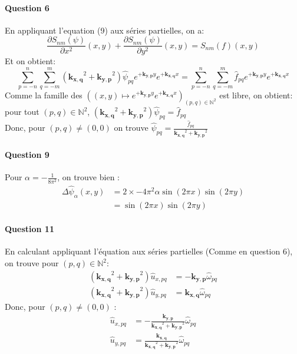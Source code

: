\documentclass{article}
\newcommand{\pd}[2]{\dfrac{\partial#1}{\partial#2}}
\newcommand{\complex}[1]{\bm{#1}}
\newcommand{\kxq}{\complex{k_{x,q}}}
\newcommand{\kyp}{\complex{k_{y,p}}}
\begin{document}
\paragraph{Question 6}
En appliquant l'equation (9) aux séries partielles, on a:
\begin{equation}
	\pd{S_{nm}(\psi)}{x^2}(x,y)
    + 
	\pd{S_{nm}(\psi)}{y^2}(x,y)
	= S_{nm}(f)(x,y)
    \label{eq:poisson}
\end{equation}
Et on obtient:
\begin{equation*}
    \sum_{p=-n}^{n} \sum_{q=-m}^{m} (\kxq^2 + \kyp^2) \hat{\psi}_{pq} e^{+\kyp y} e^{+\kxq x}
	=
		\sum_{p=-n}^{n} \sum_{q=-m}^{m}\hat{f}_{pq} e^{+\kyp y} e^{+\kxq x}
\end{equation*}
Comme la famille des \(((x, y)\mapsto e^{+\kyp y} e^{+\kxq x})_{(p,q)\in\mathbb N^2}\)
est libre, on obtient: pour tout \((p,q)\in\mathbb N^2\), \((\kxq^2 + \kyp^2) \hat{\psi}_{pq} = \hat{f}_{pq}\)
\\
Donc, pour \((p,q)\neq(0,0)\) on trouve \(\hat{\psi}_{pq} = \frac{\hat{f}_{pq}}{\kxq^2 + \kyp^2}\)

\paragraph{Question 9}
Pour \(\alpha = -\frac{1}{8\pi^2}\), on trouve bien :
\begin{align*}
	\Delta \hat{\psi}_{\alpha}(x,y) & = 2\times-4\pi^2\alpha\sin(2\pi x)\sin(2\pi y)\\
	& = \sin(2\pi x)\sin(2\pi y)
\end{align*}

\paragraph{Question 11}
En calculant appliquant l'équation aux séries partielles (Comme en question 6), on trouve pour \((p,q)\in\mathbb N^2\):
\begin{align*}
	(\kxq^2 + \kyp^2)\hat{u}_{x,pq} & = -\kyp\hat{\omega}_{pq}\\
	(\kxq^2 + \kyp^2)\hat{u}_{y,pq} & =  \kxq\hat{\omega}_{pq}
\end{align*}
Donc, pour \((p,q) \neq (0,0)\) :
\begin{align*}
	\hat{u}_{x,pq} & = -\frac{\kyp}{\kxq^2 + \kyp^2}\hat{\omega}_{pq}\\
	\hat{u}_{y,pq} & =  \frac{\kxq}{\kxq^2 + \kyp^2}\hat{\omega}_{pq}
\end{align*}
\end{document}
